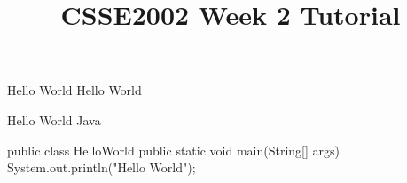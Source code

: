 \documentclass[week2]{csse2002}
\title{CSSE2002 Week 2 Tutorial}
\begin{document}
\begin{frame} 
\maketitle
\end{frame}

\begin{topic}{Hello World}
Hello World
\end{topic}

\begin{topic}{Hello World Java}
\begin{java}
public class HelloWorld {
    public static void main(String[] args) {
        System.out.println("Hello World");
    }
}
\end{java}
\end{topic}
\end{document}
